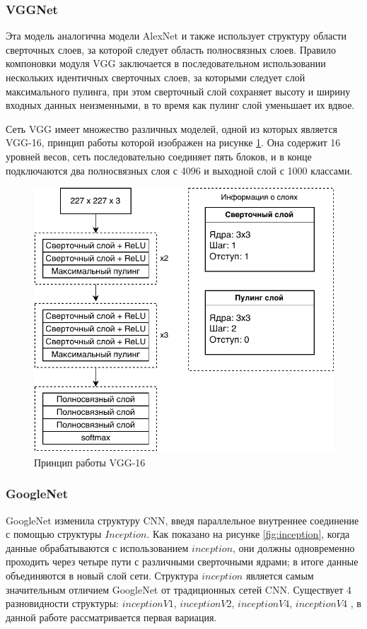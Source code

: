 \subsubsection{VGGNet}
Эта модель аналогична модели AlexNet и также использует структуру области сверточных слоев, за которой следует область полносвязных слоев. Правило компоновки модуля VGG заключается в последовательном использовании нескольких идентичных сверточных слоев, за которыми следует слой максимального пулинга, при этом сверточный слой сохраняет высоту и ширину входных данных неизменными, в то время как пулинг слой уменьшает их вдвое. 

Сеть VGG имеет множество различных моделей, одной из которых является VGG-16, принцип работы которой изображен на рисунке \ref{fig:vggnet}. Она содержит 16 уровней весов, сеть последовательно соединяет пять блоков, и в конце подключаются два полносвязных слоя с 4096 и выходной слой с 1000 классами.

\begin{figure}[hbtp]
	\centering
	\includegraphics[width=\textwidth]{img/VGGNet.pdf}
	\caption{Принцип работы VGG-16}
	\label{fig:vggnet}
\end{figure}
\clearpage


\subsubsection{GoogleNet}
GoogleNet изменила структуру CNN, введя параллельное внутреннее соединение с помощью структуры $Inception$. Как показано на рисунке \ref{fig:inception}, когда данные обрабатываются с использованием $inception$, они должны одновременно проходить через четыре пути с различными сверточными ядрами; в итоге данные объединяются в новый слой сети. Структура $inception$ является самым значительным отличием GoogleNet от традиционных сетей CNN. Существует 4 разновидности структуры: $inceptionV1$, $inceptionV2$, $inceptionV4$, $inceptionV4$ \cite{googlenet}, в данной работе рассматривается первая вариация.

